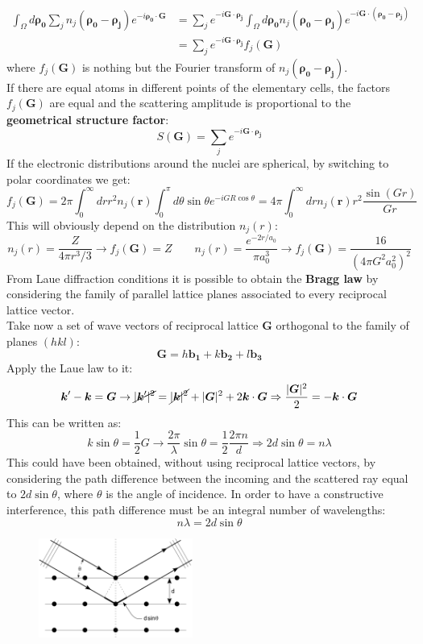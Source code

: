 \documentclass[10.75pt,a4paper,openright,bottom=2cm]{article}
\renewcommand{\Vec}[1]{\boldsymbol{#1}}
\begin{document}
\begin{align*}
\int_\Omega d\Vec{\rho_0}\sum_jn_j(\Vec{\rho_0}-\Vec{\rho_j})e^{-i\Vec{\rho_0}\cdot\Vec{G}}&=\sum_je^{-i\Vec{G}\cdot\Vec{\rho_j}}\int_\Omega d\Vec{\rho_0}n_j(\Vec{\rho_0}-\Vec{\rho_j})e^{-i\Vec{G}\cdot(\Vec{\rho_0}-\Vec{\rho_j})}\\
&=\sum_je^{-i\Vec{G}\cdot\Vec{\rho_j}}f_j(\Vec{G})
\end{align*}
where $f_j(\Vec{G})$ is nothing but the Fourier transform of $n_j(\Vec{\rho_0}-\Vec{\rho_j})$.\\
If there are equal atoms in different points of the elementary cells, the factors $f_j(\Vec{G})$ are equal and the scattering amplitude is proportional to the \textbf{geometrical structure factor}:
\[
S(\Vec{G})=\sum_je^{-i\Vec{G}\cdot\Vec{\rho_j}}
\]
If the electronic distributions around the nuclei are spherical, by switching to polar coordinates we get:
\[
f_j(\Vec{G})=2\pi\int_0^\infty drr^2n_j(\Vec{r})\int_0^\pi d\theta\sin\theta e^{-iGR\cos\theta}=4\pi\int_0^\infty drn_j(\Vec{r})r^2\frac{\sin(Gr)}{Gr}
\]
This will obviously depend on the distribution $n_j(r)$:
\[
n_j(r)=\frac{Z}{4\pi r^3/3}\to f_j(\Vec{G})=Z \qquad n_j(r)=\frac{e^{-2r/a_0}}{\pi a_0^3}\to f_j(\Vec{G})=\frac{16}{(4\pi G^2a_0^2)^2}
\]
From Laue diffraction conditions it is possible to obtain the \textbf{Bragg law} by considering the family of parallel lattice planes associated to every reciprocal lattice vector.\\
Take now a set of wave vectors of reciprocal lattice $\Vec{G}$ orthogonal to the family of planes $(hkl)$:
\[
\Vec{G}=h\Vec{b_1}+k\Vec{b_2}+l\Vec{b_3}
\]
Apply the Laue law to it:
\[
\Vec{k}'-\Vec{k}=\Vec{G}\to\cancel{|\Vec{k}'|^2}=\cancel{|\Vec{k}|^2}+|\Vec{G}|^2+2\Vec{k}\cdot\Vec{G}\Rightarrow\frac{|\Vec{G}|^2}{2}=-\Vec{k}\cdot\Vec{G}
\]
This can be written as:
\[
k\sin\theta=\frac{1}{2}G\to\frac{2\pi}{\lambda}\sin\theta=\frac{1}{2}\frac{2\pi n}{d}\Rightarrow2d\sin\theta=n\lambda
\]
This could have been obtained, without using reciprocal lattice vectors, by considering the path difference between the incoming and the scattered ray equal to $2d\sin\theta$, where $\theta$ is the angle of incidence. In order to have a constructive interference, this path difference must be an integral number of wavelengths:
\[
n\lambda=2d\sin\theta
\]
\begin{figure}[h]
    \centering
    \includegraphics[width=0.45\textwidth]{bragg.png}
     
    \label{fig:bragg}
\end{figure}
\end{document}
